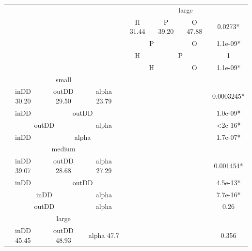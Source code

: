 \documentclass{l4proj}
\begin{document}
\begin{table}[]
\begin{tabular}{|c|c|c|c|c|c|c|}
\multicolumn{3}{|c|}{}                    & \multicolumn{4}{c|}{large}                                 \\ \cline{4-7} 
\multicolumn{3}{|c|}{}                    & H   31.44    & P   39.20   & O  47.88   & 0.0273*          \\ \cline{4-7} 
\multicolumn{3}{|c|}{}                    & \multicolumn{2}{c|}{P}     & O          & 1.1e-09*         \\ \cline{4-7} 
\multicolumn{3}{|c|}{}                    & H            & \multicolumn{2}{c|}{P}   & 1                \\ \cline{4-7} 
\multicolumn{3}{|c|}{}                    & \multicolumn{2}{c|}{H}     & O          & 1.1e-09*         \\ \hline
\multicolumn{3}{|c|}{small}               & \multicolumn{3}{c|}{\multirow{12}{*}{}} &                  \\ \cline{1-3} \cline{7-7} 
inDD 30.20   & outDD 29.50  & alpha 23.79 & \multicolumn{3}{c|}{}                   & 0.0003245*       \\ \cline{1-3} \cline{7-7} 
inDD         & \multicolumn{2}{c|}{outDD} & \multicolumn{3}{c|}{}                   & 1.0e-09*         \\ \cline{1-3} \cline{7-7} 
\multicolumn{2}{|c|}{outDD} & alpha       & \multicolumn{3}{c|}{}                   & \textless 2e-16* \\ \cline{1-3} \cline{7-7} 
inDD         & \multicolumn{2}{c|}{alpha} & \multicolumn{3}{c|}{}                   & 1.7e-07*         \\ \cline{1-3} \cline{7-7} 
\multicolumn{3}{|c|}{medium}              & \multicolumn{3}{c|}{}                   &                  \\ \cline{1-3} \cline{7-7} 
inDD 39.07   & outDD 28.68  & alpha 27.29 & \multicolumn{3}{c|}{}                   & 0.001454*        \\ \cline{1-3} \cline{7-7} 
inDD         & \multicolumn{2}{c|}{outDD} & \multicolumn{3}{c|}{}                   & 4.5e-13*         \\ \cline{1-3} \cline{7-7} 
\multicolumn{2}{|c|}{inDD}  & alpha       & \multicolumn{3}{c|}{}                   & 7.7e-16*         \\ \cline{1-3} \cline{7-7} 
\multicolumn{2}{|c|}{outDD} & alpha       & \multicolumn{3}{c|}{}                   & 0.26             \\ \cline{1-3} \cline{7-7} 
\multicolumn{3}{|c|}{large}               & \multicolumn{3}{c|}{}                   &                  \\ \cline{1-3} \cline{7-7} 
inDD 45.45   & outDD 48.93  & alpha 47.7  & \multicolumn{3}{c|}{}                   & 0.356            \\ \hline
\end{tabular}
\end{table}
\end{document}
